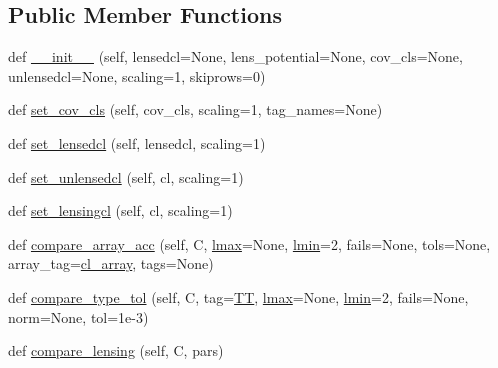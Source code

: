 \subsection*{Public Member Functions}
\begin{DoxyCompactItemize}
\item 
def \mbox{\hyperlink{classcambPlots_1_1ClResult_abcd4d1fa21956cc6cefd41abbfd7500e}{\+\_\+\+\_\+init\+\_\+\+\_\+}} (self, lensedcl=None, lens\+\_\+potential=None, cov\+\_\+cls=None, unlensedcl=None, scaling=1, skiprows=0)
\item 
def \mbox{\hyperlink{classcambPlots_1_1ClResult_a5c7be3ff40c99aba49a78c320dfc3a50}{set\+\_\+cov\+\_\+cls}} (self, cov\+\_\+cls, scaling=1, tag\+\_\+names=None)
\item 
def \mbox{\hyperlink{classcambPlots_1_1ClResult_a274c3abd74f9d6bc3a2a94428abce3a0}{set\+\_\+lensedcl}} (self, lensedcl, scaling=1)
\item 
def \mbox{\hyperlink{classcambPlots_1_1ClResult_a877f90feb35255e3d3b3a34d2f035309}{set\+\_\+unlensedcl}} (self, cl, scaling=1)
\item 
def \mbox{\hyperlink{classcambPlots_1_1ClResult_a8d99b24daec518d36af637dbe89cfa22}{set\+\_\+lensingcl}} (self, cl, scaling=1)
\item 
def \mbox{\hyperlink{classcambPlots_1_1ClResult_a40650762890a6120cc294d54cac15e36}{compare\+\_\+array\+\_\+acc}} (self, C, \mbox{\hyperlink{classcambPlots_1_1ClResult_a6ddd30c811f5ce588146457cd12f8d8c}{lmax}}=None, \mbox{\hyperlink{plotTT_8m_aef6a8f6b3fd299f38d7aeaa7aff6bbf3}{lmin}}=2, fails=None, tols=None, array\+\_\+tag=\textquotesingle{}\mbox{\hyperlink{classcambPlots_1_1ClResult_a47706b8004a10920546cd73bfd8f6e16}{cl\+\_\+array}}\textquotesingle{}, tags=None)
\item 
def \mbox{\hyperlink{classcambPlots_1_1ClResult_aaffae6fc9084e491c64e5ae37dfd9cec}{compare\+\_\+type\+\_\+tol}} (self, C, tag=\textquotesingle{}\mbox{\hyperlink{classcambPlots_1_1ClResult_ac634df087ab7f5739dd8409c61917b2b}{TT}}\textquotesingle{}, \mbox{\hyperlink{classcambPlots_1_1ClResult_a6ddd30c811f5ce588146457cd12f8d8c}{lmax}}=None, \mbox{\hyperlink{plotTT_8m_aef6a8f6b3fd299f38d7aeaa7aff6bbf3}{lmin}}=2, fails=None, norm=None, tol=1e-\/3)
\item 
def \mbox{\hyperlink{classcambPlots_1_1ClResult_ab744582b8633917fcd8c8d45cb0fa3c4}{compare\+\_\+lensing}} (self, C, pars)
\end{DoxyCompactItemize}
